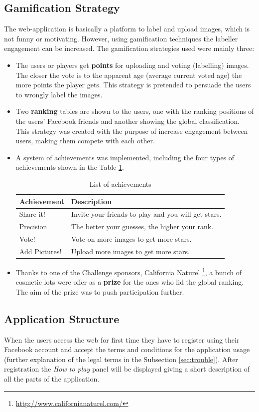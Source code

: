 \subsection{Gamification Strategy}
The web-application is basically a platform to label and upload images, which is not funny or motivating. However, using gamification techniques the labeller engagement can be increased. The gamification strategies used were mainly three:

\begin{itemize}
	\item The users or players get \textbf{points} for uploading and voting (labelling) images. The closer the vote is to the apparent age (average current voted age) the more points the player gets. This strategy is pretended to persuade the users to wrongly label the images.
	\item Two \textbf{ranking} tables are shown to the users, one with the ranking positions of the users' Facebook friends and another showing the global classification. This strategy was created with the purpose of increase engagement between users, making them compete with each other. 
	\item A system of achievements was implemented, including the four types of achievements shown in the Table \ref{tab:achiev}.
	\begin{table}[!h]
		\centering
		\begin{tabular}{l|l}
			\textbf{Achievement} & \textbf{Description} \\ \hline
			Share it! &	Invite your friends to play and you will get stars.	\\
			Precision &	The better your guesses, the higher your rank. \\
			Vote! &	Vote on more images to get more stars.\\	
			Add Pictures! &	Upload more images to get more stars. \\
		\end{tabular}
		\caption{List of achievements}
		\label{tab:achiev}
	\end{table}
	\item Thanks to one of the Challenge sponsors, California Naturel \footnote{\url{http://www.californianaturel.com/}}, a bunch of cosmetic lots were offer as a \textbf{prize} for the ones who lid the global ranking. The aim of the prize was to push participation further.
\end{itemize}


\subsection{Application Structure}
When the users access the web for first time they have to register using their Facebook account and accept the terms and conditions for the application usage (further explanation of the legal terms in the Subsection \ref{sec:trouble}). After registration the \textit{How to play} panel will be displayed giving a short description of all the parts of the application.

